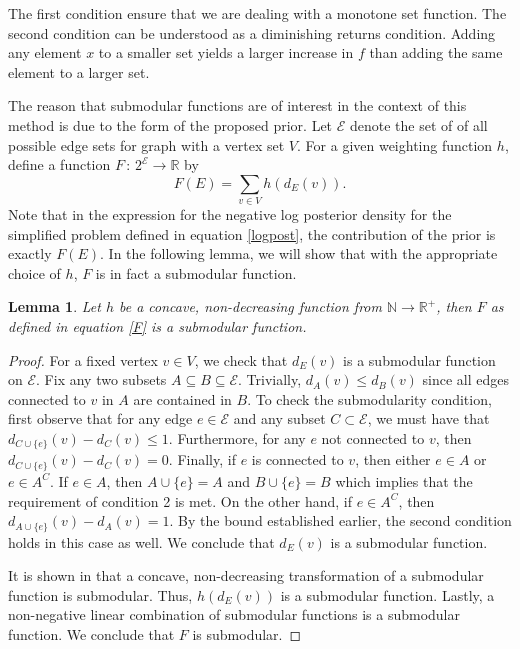 \documentclass{uwstat572}
\newtheorem{lemma}[theorem]{Lemma}
\theoremstyle{remark}
\theoremstyle{definition}
\begin{document}
The first condition ensure that we are dealing with a monotone set function. The second condition can be understood as a diminishing returns condition.  Adding any element $x$ to a smaller set yields a larger increase in $f$ than adding the same element to a larger set.

The reason that submodular functions are of interest in the context of this method is due to the form of the proposed prior.  Let $\mathcal{E}$ denote the set of of all possible edge sets for graph with a vertex set $V$.  For a given weighting function $h$, define a function $F \, : \, 2^{\mathcal{E}} \to \mathbb{R}$ by
\begin{equation}\label{F}
F(E) = \sum_{v \in V} h(d_E(v)).
\end{equation}
Note that in the expression for the  negative log posterior density for the simplified problem defined in equation \eqref{logpost}, the contribution of the prior is exactly $ F(E)$.  In the following lemma, we will show that with the appropriate choice of $h$, $F$ is in fact a submodular function.

\begin{lemma}
Let $h$ be a concave, non-decreasing function from $\mathbb{N} \to \mathbb{R}^+$, then $F$ as defined in equation \eqref{F} is a submodular function.
\end{lemma}
\begin{proof}
For a fixed vertex $v \in V$, we check that $d_E(v)$ is a submodular function on $\mathcal{E}$.  Fix any two subsets $A \subseteq B \subseteq \mathcal{E}$.  Trivially, $d_A(v) \leq d_B(v)$ since all edges connected to $v$ in $A$ are contained in $B$.  To check the submodularity condition, first observe that for any edge $e \in \mathcal{E}$ and any subset $C \subset \mathcal{E}$, we must have that $d_{C \cup \{e\}}(v) - d_{C}(v) \leq 1$.  Furthermore, for any $e$ not connected to $v$, then $d_{C \cup \{e\}}(v) - d_{C}(v) = 0$.  Finally, if $e$ is connected to $v$, then either $e \in A$ or $e \in A^C$.  If $e \in A$, then $A \cup \{e\} = A$ and $B \cup \{e\} = B$ which implies that the requirement of condition 2 is met.  On the other hand, if $e \in A^C$, then $d_{A \cup \{e\}} (v) - d_A(v) = 1$.  By the bound established earlier, the second condition holds in this case as well.  We conclude that
$d_E(v)$ is a submodular function.

It is shown in \cite{fujishige2005submodular} that a concave, non-decreasing transformation of a submodular function is submodular.  Thus, $h(d_E(v))$ is a submodular function.  Lastly, a non-negative linear combination of submodular functions is a submodular function.  We conclude that $F$ is submodular.
\end{proof}
\end{document}
